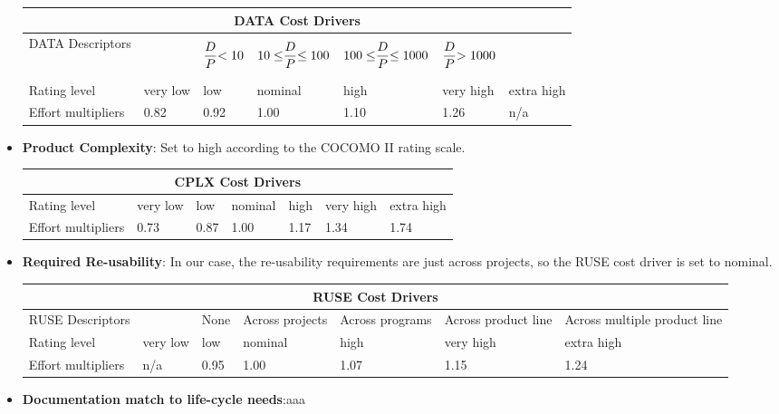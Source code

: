 \begin{itemize}
\begin{longtable}{| m{}| m{} | m{} | m{} | m{} | m{} | m{}| }
\hline
\multicolumn{7}{c}{DATA Cost Drivers}\\
\hline
\hline
DATA Descriptors &  & \begin{equation*}
 {D \over P} {<10} 
\end{equation*} & 
\begin{equation*}
{10\le} {D \over P} {\le 100}
\end{equation*}& 
\begin{equation*}
{100\le} {D \over P} {\le 1000}
\end{equation*} & 
\begin{equation*}
 {D \over P} {>1000} 
\end{equation*}
& \\
\hline
Rating level & very low & low & nominal & high & very high & extra high \\
\hline
Effort multipliers & 0.82 & 0.92 & 1.00 & 1.10 & 1.26 & n/a \\
\hline
\end{longtable}

\item \textbf{Product Complexity}:
Set to high according to the COCOMO II rating scale.

\begin{longtable}{| m{}| m{} | m{} | m{} | m{} | m{} | m{}| }
\hline
\multicolumn{7}{c}{CPLX Cost Drivers}\\
\hline
\hline
Rating level & very low & low & nominal & high & very high & extra high \\
\hline
Effort multipliers & 0.73 & 0.87 & 1.00 & 1.17 & 1.34 & 1.74 \\
\hline
\end{longtable}

\item \textbf{Required Re-usability}:
In our case, the re-usability requirements are just across projects, so the RUSE cost driver is set to nominal.

\begin{longtable}{| m{}| m{} | m{} | m{} | m{} | m{} | m{}| }
\hline
\multicolumn{7}{c}{RUSE Cost Drivers}\\
\hline
\hline
RUSE Descriptors &  & None & Across projects & Across programs & Across product line & Across multiple product line\\
\hline
Rating level & very low & low & nominal & high & very high & extra high \\
\hline
Effort multipliers & n/a & 0.95 &1.00 & 1.07 & 1.15 & 1.24 \\
\hline
\end{longtable}

\item \textbf{Documentation match to life-cycle needs}:aaa


\end{itemize}